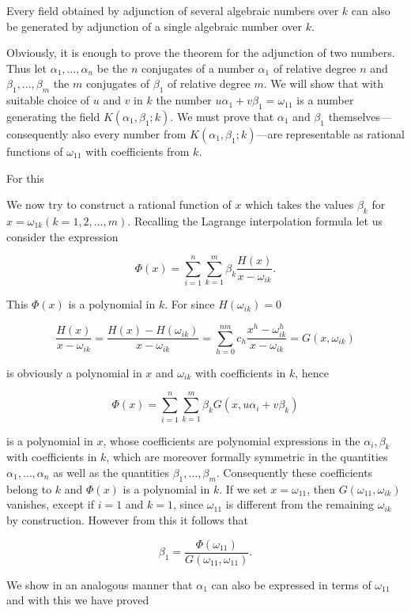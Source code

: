 Every field obtained by adjunction of several algebraic numbers over $k$ can also be generated by adjunction of a single algebraic number over $k$.

Obviously, it is enough to prove the theorem for the adjunction of two numbers. Thus let $\alpha_1, \ldots, \alpha_n$ be the $n$ conjugates of a number $\alpha_1$ of relative degree $n$ and $\beta_1, \ldots, \beta_m$ the $m$ conjugates of $\beta_1$ of relative degree $m$. We will show that with suitable choice of $u$ and $v$ in $k$ the number $u\alpha_1 + v\beta_1 = \omega_{11}$ is a number generating the field $K(\alpha_1, \beta_1; k)$. We must prove that $\alpha_1$ and $\beta_1$ themselves—consequently also every number from $K(\alpha_1, \beta_1; k)$—are representable as rational functions of $\omega_{11}$ with coefficients from $k$.

For this

We now try to construct a rational function of $x$ which takes the values $\beta_k$ for $x = \omega_{1k} (k = 1, 2, \ldots, m)$. Recalling the Lagrange interpolation formula let us consider the expression

$$\Phi(x) = \sum_{i=1}^{n} \sum_{k=1}^{m} \beta_k \frac{H(x)}{x - \omega_{ik}}.$$

This $\Phi(x)$ is a polynomial in $k$. For since $H(\omega_{ik}) = 0$

$$\frac{H(x)}{x - \omega_{ik}} = \frac{H(x) - H(\omega_{ik})}{x - \omega_{ik}} = \sum_{h=0}^{nm} c_h \frac{x^h - \omega_{ik}^h}{x - \omega_{ik}} = G(x, \omega_{ik})$$

is obviously a polynomial in $x$ and $\omega_{ik}$ with coefficients in $k$, hence

$$\Phi(x) = \sum_{i=1}^{n} \sum_{k=1}^{m} \beta_k G(x, u\alpha_i + v\beta_k)$$

is a polynomial in $x$, whose coefficients are polynomial expressions in the $\alpha_i, \beta_k$ with coefficients in $k$, which are moreover formally symmetric in the quantities $\alpha_1, \ldots, \alpha_n$ as well as the quantities $\beta_1, \ldots, \beta_m$. Consequently these coefficients belong to $k$ and $\Phi(x)$ is a polynomial in $k$. If we set $x = \omega_{11}$, then $G(\omega_{11}, \omega_{ik})$ vanishes, except if $i = 1$ and $k = 1$, since $\omega_{11}$ is different from the remaining $\omega_{ik}$ by construction. However from this it follows that

$$\beta_1 = \frac{\Phi(\omega_{11})}{G(\omega_{11}, \omega_{11})}.$$

We show in an analogous manner that $\alpha_1$ can also be expressed in terms of $\omega_{11}$ and with this we have proved

